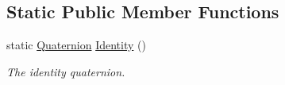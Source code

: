 \subsection*{Static Public Member Functions}
\begin{DoxyCompactItemize}
\item 
\hypertarget{classgfxmath_1_1_quaternion_ace9f51df9b457cbce0c4901087009548}{}static \hyperlink{classgfxmath_1_1_quaternion}{Quaternion} \hyperlink{classgfxmath_1_1_quaternion_ace9f51df9b457cbce0c4901087009548}{Identity} ()\label{classgfxmath_1_1_quaternion_ace9f51df9b457cbce0c4901087009548}

\begin{DoxyCompactList}\small\item\em The identity quaternion. \end{DoxyCompactList}\end{DoxyCompactItemize}
